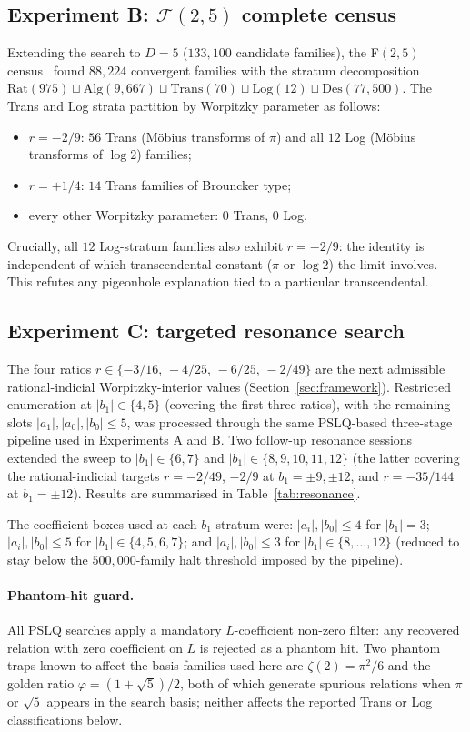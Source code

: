 \documentclass[11pt]{amsart}
\theoremstyle{definition}
\theoremstyle{remark}
\newcommand{\FF}{\mathcal{F}}
\newcommand{\Rat}{\mathrm{Rat}}
\newcommand{\Log}{\mathrm{Log}}
\newcommand{\Alg}{\mathrm{Alg}}
\newcommand{\Trans}{\mathrm{Trans}}
\newcommand{\Des}{\mathrm{Des}}
\begin{document}
\subsection*{Experiment B: $\FF(2,5)$ complete census}
Extending the search to $D = 5$ ($133{,}100$ candidate families), the
F$(2,5)$ census~\cite{F25} found $88{,}224$ convergent families with
the stratum decomposition $\Rat(975) \sqcup \Alg(9{,}667) \sqcup
\Trans(70) \sqcup \Log(12) \sqcup \Des(77{,}500)$.  The Trans and
Log strata partition by Worpitzky parameter as follows:
\begin{itemize}
\item $r = -2/9$: $56$ Trans (M\"obius transforms of $\pi$) and
all $12$ Log (M\"obius transforms of $\log 2$) families;
\item $r = +1/4$: $14$ Trans families of Brouncker type;
\item every other Worpitzky parameter: $0$ Trans, $0$ Log.
\end{itemize}
Crucially, all $12$ Log-stratum families also exhibit $r = -2/9$:
the identity is independent of which transcendental constant
($\pi$ or $\log 2$) the limit involves.  This refutes any pigeonhole
explanation tied to a particular transcendental.

\subsection*{Experiment C: targeted resonance search}
The four ratios $r \in \{-3/16,\,-4/25,\,-6/25,\,-2/49\}$ are the
next admissible rational-indicial Worpitzky-interior values
(Section~\ref{sec:framework}).  Restricted enumeration at
$|b_1| \in \{4, 5\}$ (covering the first three ratios), with the
remaining slots $|a_1|, |a_0|, |b_0| \le 5$, was processed through
the same PSLQ-based three-stage pipeline used in Experiments A and
B.  Two follow-up resonance sessions extended the sweep to
$|b_1| \in \{6, 7\}$ and $|b_1| \in \{8,9,10,11,12\}$
(the latter covering the rational-indicial targets $r = -2/49$,
$-2/9$ at $b_1 = \pm 9, \pm 12$, and $r = -35/144$ at
$b_1 = \pm 12$).  Results are summarised in
Table~\ref{tab:resonance}.

The coefficient boxes used at each $b_1$ stratum were:
$|a_i|, |b_0| \le 4$ for $|b_1| = 3$;
$|a_i|, |b_0| \le 5$ for $|b_1| \in \{4, 5, 6, 7\}$; and
$|a_i|, |b_0| \le 3$ for $|b_1| \in \{8,\ldots,12\}$ (reduced to
stay below the $500{,}000$-family halt threshold imposed by the
pipeline).

\paragraph{Phantom-hit guard.}
All PSLQ searches apply a mandatory $L$-coefficient non-zero
filter: any recovered relation with zero coefficient on $L$ is
rejected as a phantom hit.  Two phantom traps known to affect the
basis families used here are $\zeta(2) = \pi^2/6$ and the golden
ratio $\varphi = (1+\sqrt{5})/2$, both of which generate spurious
relations when $\pi$ or $\sqrt{5}$ appears in the search basis;
neither affects the reported Trans or Log classifications below.
\end{document}
